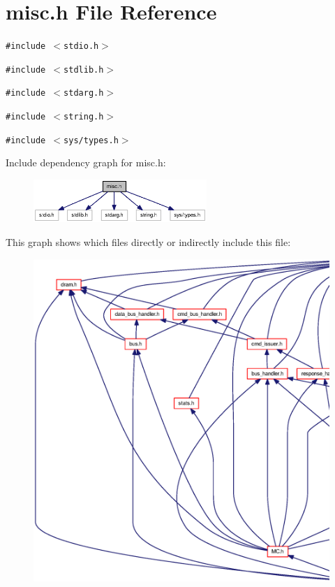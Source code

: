 \section{misc.h File Reference}
\label{misc_8h}
{\tt \#include $<$stdio.h$>$}\par
{\tt \#include $<$stdlib.h$>$}\par
{\tt \#include $<$stdarg.h$>$}\par
{\tt \#include $<$string.h$>$}\par
{\tt \#include $<$sys/types.h$>$}\par


Include dependency graph for misc.h:\nopagebreak
\begin{figure}[H]
\begin{center}
\leavevmode
\includegraphics[width=186pt]{misc_8h__incl}
\end{center}
\end{figure}


This graph shows which files directly or indirectly include this file:\nopagebreak
\begin{figure}[H]
\begin{center}
\leavevmode
\includegraphics[width=420pt]{misc_8h__dep__incl}
\end{center}
\end{figure}
